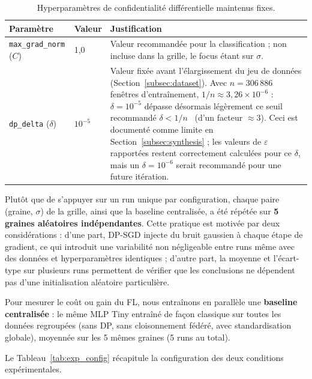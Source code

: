 \documentclass{article}
\begin{document}
\begin{table}[h!]
  \centering
  \caption{Hyperparamètres de confidentialité différentielle maintenus fixes.}
  \label{tab:dp_params_justif}
  \begin{tabular}{llp{6cm}}
    \toprule
    Paramètre & Valeur & Justification \\
    \midrule
    \texttt{max\_grad\_norm} ($C$) & 1,0 & Valeur recommandée pour la
    classification ; non incluse dans la grille, le focus étant sur $\sigma$. \\
    \texttt{dp\_delta} ($\delta$) & $10^{-5}$ & Valeur fixée avant l'élargissement du
    jeu de données (Section~\ref{subsec:dataset}). Avec $n = 306\,886$ fenêtres
    d'entraînement, $1/n \approx 3{,}26 \times 10^{-6}$ : $\delta = 10^{-5}$ dépasse
    désormais légèrement ce seuil recommandé $\delta < 1/n$~\cite{dwork2014foundations}
    (d'un facteur $\approx 3$). Ceci est documenté comme limite en
    Section~\ref{subsec:synthesis} ; les valeurs de $\varepsilon$ rapportées restent
    correctement calculées pour ce $\delta$, mais un $\delta = 10^{-6}$ serait
    recommandé pour une future itération. \\
    \bottomrule
  \end{tabular}
\end{table}

Plutôt que de s'appuyer sur un run unique par configuration, chaque paire (graine,
$\sigma$) de la grille, ainsi que la baseline centralisée, a été répétée sur
\textbf{5 graines aléatoires indépendantes}. Cette pratique est motivée par deux
considérations : d'une part, DP-SGD injecte du bruit gaussien à chaque étape de
gradient, ce qui introduit une variabilité non négligeable entre runs même avec des
données et hyperparamètres identiques ; d'autre part, la moyenne et l'écart-type sur
plusieurs runs permettent de vérifier que les conclusions ne dépendent pas d'une
initialisation aléatoire particulière.

Pour mesurer le coût ou gain du FL, nous entraînons en parallèle une
\textbf{baseline centralisée} : le même MLP Tiny entraîné de façon classique sur
toutes les données regroupées (sans DP, sans cloisonnement fédéré, avec
standardisation globale), moyennée sur les 5 mêmes graines (5 runs au total).

Le Tableau~\ref{tab:exp_config} récapitule la configuration des deux conditions
expérimentales.
\end{document}
